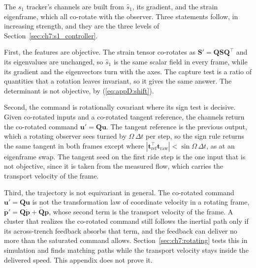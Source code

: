 The $s_1$ tracker's channels are built from $\hat{s}_1$, its gradient,
and the strain eigenframe, which all co-rotate with the observer. Three
statements follow, in increasing strength, and they are the three levels
of Section~\ref{sec:ch7:s1_controller}.

First, the features are objective. The strain tensor co-rotates as
$\mathbf{S}' = \mathbf{Q}\mathbf{S}\mathbf{Q}^{\top}$ and its eigenvalues
are unchanged, so $\hat{s}_1$ is the same scalar field in every frame,
while its gradient and the eigenvectors turn with the axes. The capture
test is a ratio of quantities that a rotation leaves invariant, so it gives
the same answer. The determinant is not objective, by
(\ref{eq:appD:shift}).

Second, the command is rotationally covariant where its sign test is
decisive. Given co-rotated inputs and a co-rotated tangent reference, the
channels return the co-rotated command $\mathbf{u}' = \mathbf{Q}\mathbf{u}$.
The tangent reference is the previous output, which a rotating observer
sees turned by $\Omega\,\Delta t$ per step, so the sign rule returns the
same tangent in both frames except where
$|\mathbf{t}_{\mathrm{ref}}^{\top}\mathbf{t}_{\mathrm{raw}}| <
\sin\Omega\,\Delta t$, as at an eigenframe swap. The tangent seed on the
first ride step is the one input that is not objective, since it is taken
from the measured flow, which carries the transport velocity of the frame.

Third, the trajectory is not equivariant in general. The co-rotated
command $\mathbf{u}' = \mathbf{Q}\mathbf{u}$ is not the transformation law
of coordinate velocity in a rotating frame,
$\dot{\mathbf{p}}' = \mathbf{Q}\dot{\mathbf{p}} + \dot{\mathbf{Q}}\mathbf{p}$,
whose second term is the transport velocity of the frame. A cluster that
realizes the co-rotated command still follows the inertial path only if
its across-trench feedback absorbs that term, and the feedback can deliver
no more than the saturated command allows. Section~\ref{sec:ch7:rotating}
tests this in simulation and finds matching paths while the transport
velocity stays inside the delivered speed. This appendix does not prove it.
